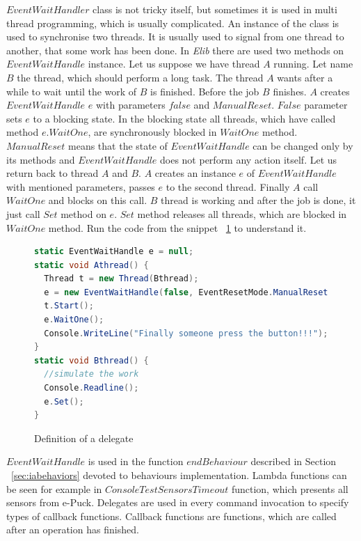   $EventWaitHandler$ class is not tricky itself, but sometimes it is used in multi thread programming, which is usually complicated.
  An instance of the class is used to synchronise two threads. It is usually used to signal from one thread to another, 
  that some work has been done. In {\it Elib} there are used two methods on $EventWaitHandle$ instance.
  Let us suppose we have thread $A$ running. Let name $B$ the thread, which should perform a long task. 
  The thread $A$ wants after a while to wait until the work of $B$ is finished.
  Before the job $B$ finishes. $A$ creates $EventWaitHandle$ $e$ with parameters $false$ and $ManualReset$. 
  $False$ parameter sets $e$ to a blocking state. In the blocking state all threads, which have called method $e.WaitOne$, 
  are synchronously blocked in $WaitOne$ method. $ManualReset$ means that the state of $EventWaitHandle$ 
  can be changed only by its methods and $EventWaitHandle$ does not perform any action itself.
  Let us return back to thread $A$ and $B$. $A$ creates an instance $e$ of $EventWaitHandle$ with mentioned parameters, 
  passes $e$ to the second thread. 
  Finally $A$ call $WaitOne$ and blocks on this call.
  $B$ thread is working and after the job is done, it just call $Set$ method on $e$. 
  $Set$ method releases all threads, which are blocked in $WaitOne$ method.
  Run the code from the snippet ~\ref{ewh} to understand it.

          
\begin{figure}[!hbp]
\begin{lstlisting}[language=cs]
static EventWaitHandle e = null;
static void Athread() {
  Thread t = new Thread(Bthread);
  e = new EventWaitHandle(false, EventResetMode.ManualReset);
  t.Start();
  e.WaitOne();
  Console.WriteLine("Finally someone press the button!!!");
}
static void Bthread() {
  //simulate the work      
  Console.Readline();
  e.Set();
}
\end{lstlisting}
\caption{Definition of a delegate} \label{ewh}
\end{figure}

   $EventWaitHandle$ is used in the function $endBehaviour$ described in Section ~\ref{sec:iabehaviors} 
   devoted to behaviours implementation.
   Lambda functions can be seen for example in $ConsoleTestSensorsTimeout$ function, which presents all sensors from e-Puck.
   Delegates are used in every command invocation to specify types of callback functions.
   Callback functions are functions, which are called after an operation has finished.
  
